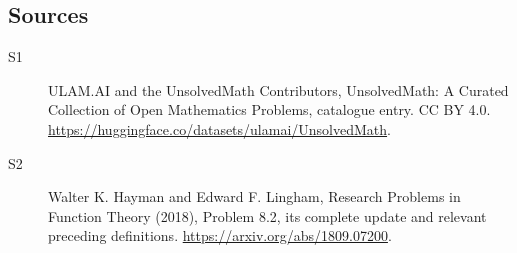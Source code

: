 \documentclass[11pt]{article}
\begin{document}
\subsection{Sources}
\begin{description}
\item[\hypertarget{source:statement:1}{S1}] ULAM.AI and the UnsolvedMath Contributors, UnsolvedMath: A Curated Collection of Open Mathematics Problems, catalogue entry. CC BY 4.0. \url{https://huggingface.co/datasets/ulamai/UnsolvedMath}.
\item[\hypertarget{source:statement:2}{S2}] Walter K. Hayman and Edward F. Lingham, Research Problems in Function Theory (2018), Problem 8.2, its complete update and relevant preceding definitions. \url{https://arxiv.org/abs/1809.07200}.
\end{description}
\label{end:statement}
\end{document}
